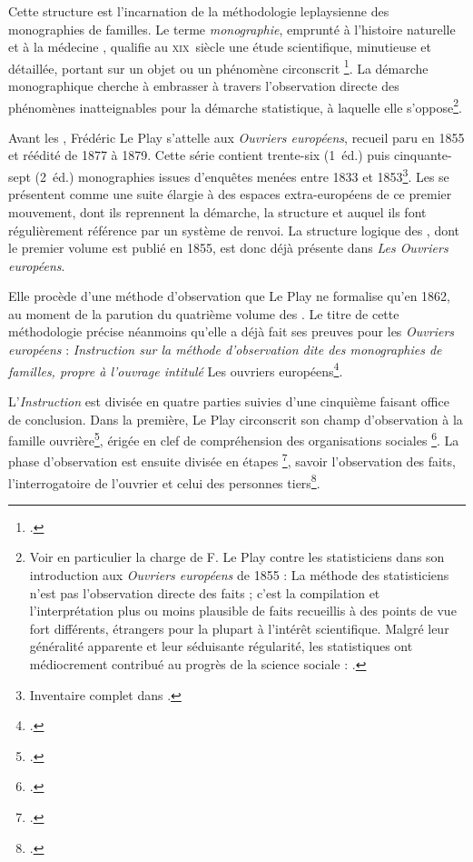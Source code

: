 Cette structure est l'incarnation de la méthodologie leplaysienne des monographies de familles. Le terme \textit{monographie}, \og emprunté à l'histoire naturelle et à la médecine \fg{}, qualifie au \textsc{xix}\ieme ~siècle une \og étude scientifique, minutieuse et détaillée, portant sur un objet ou un phénomène circonscrit \fg{}\footnote{\cite[p. 12]{savoye2}.}. La démarche monographique cherche à embrasser à travers l'observation directe des phénomènes inatteignables pour la démarche statistique, à laquelle elle s'oppose\footnote{Voir en particulier la charge de F. Le Play contre les statisticiens dans son introduction aux \textit{Ouvriers européens} de 1855 : \og La méthode des statisticiens n'est pas l'observation directe des faits ; c'est la compilation et l'interprétation plus ou moins plausible de faits recueillis à des points de vue fort différents, étrangers pour la plupart à l'intérêt scientifique. Malgré leur généralité apparente et leur séduisante régularité, les statistiques ont médiocrement contribué au progrès de la science sociale \fg{} : \cite[p.~11]{oe1855}.}.

Avant les \odm, Frédéric Le Play s'attelle aux \textit{Ouvriers européens}, recueil paru en 1855 et réédité de 1877 à 1879. Cette série contient trente-six (1\iere{}~éd.) puis cinquante-sept (2\ieme{}~éd.) monographies issues d'enquêtes menées entre 1833 et 1853\footnote{Inventaire complet dans \cite[p. 106-112]{lorry}.}. Les \odm{} se présentent comme une suite élargie à des espaces extra-européens de ce premier mouvement, dont ils reprennent la démarche, la structure et auquel ils font régulièrement référence par un système de renvoi. La structure logique des \odm{}, dont le premier volume est publié en 1855, est donc déjà présente dans \textit{Les Ouvriers européens}.

Elle procède d'une méthode d'observation que Le Play ne formalise qu'en 1862, au moment de la parution du quatrième volume des \odm{}. Le titre de cette méthodologie précise néanmoins qu'elle a déjà fait ses preuves pour les \textit{Ouvriers européens} : \textit{Instruction sur la méthode d'observation dite des monographies de familles, propre à l'ouvrage intitulé} Les ouvriers européens\footcite{instruction62}.

L'\textit{Instruction} est divisée en quatre parties suivies d'une cinquième faisant office de conclusion. Dans la première, Le Play circonscrit son champ d'observation à la famille ouvrière\footcite[I., \og Remarques préliminaires sur l'étude des faits sociaux et sur la méthode des monographies de familles \fg{}, p. 15-16]{instruction62}, érigée en \og clef de compréhension des organisations sociales \fg{}\footcite[p. 15]{savoye2}. La phase d'observation est ensuite divisée en étapes \footcite[II., \og Règles à suivre pour procéder à l'observation des faits sociaux \fg{}, p. 17-19]{instruction62}, savoir l'observation des faits, l'interrogatoire de l'ouvrier et celui des personnes tiers\footcite[p. 16]{savoye2}.

